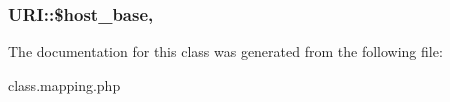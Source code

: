  \hypertarget{class_u_r_i_ad6887658f2dc46d491a319774ed6ccaa}{
\subsubsection[{\$host\-\_\-base}]{\setlength{\rightskip}{0pt plus 5cm}U\-R\-I\-::\$host\-\_\-base\hspace{0.3cm}{\ttfamily [static]}, {\ttfamily [protected]}}}\label{class_u_r_i_ad6887658f2dc46d491a319774ed6ccaa}


 

The documentation for this class was generated from the following file\-:\begin{DoxyCompactItemize}
\item 
class.\-mapping.\-php\end{DoxyCompactItemize}
